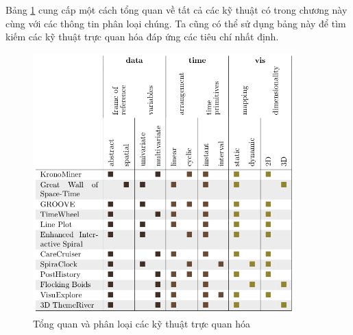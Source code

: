 Bảng \ref{fig:tb7.16} cung cấp một cách tổng quan về tất cả các kỹ thuật có trong chương này cùng với  các thông tin phân loại chúng. Ta cũng có thể sử dụng bảng này để tìm kiếm các kỹ thuật trực quan hóa đáp ứng các tiêu chí nhất định.
\begin{figure}[H] %
    \centering %
    \includegraphics[width=0.9\textwidth]{assets/tb_7_1.png} 
    \caption{Tổng quan và phân loại các kỹ thuật trực quan hóa} %
    \label{fig:tb7.16}
\end{figure}

